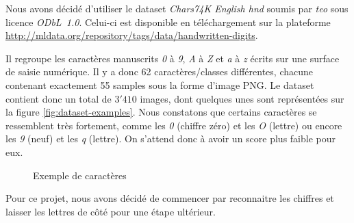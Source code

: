 

Nous avons décidé d'utiliser le dataset \emph{Chars74K English hnd} soumis par \emph{teo} sous licence \emph{ODbL~1.0}. Celui-ci est disponible en téléchargement sur la plateforme \url{http://mldata.org/repository/tags/data/handwritten-digits}.

Il regroupe les caractères manuscrits \emph{0} à \emph{9}, \emph{A} à \emph{Z} et \emph{a} à \emph{z} écrits sur une surface de saisie numérique. Il y a donc 62 caractères/classes différentes, chacune contenant exactement 55 samples sous la forme d'image PNG. Le dataset contient donc un total de $3'410$ images, dont quelques unes sont représentées sur la figure \vref{fig:dataset-examples}. Nous constatons que certains caractères se ressemblent très fortement, comme les \emph{0} (chiffre zéro) et les \emph{O} (lettre) ou encore les \emph{9} (neuf) et les \emph{q} (lettre). On s'attend donc à avoir un score plus faible pour eux.

\begin{figure}[h]
\caption{Exemple de caractères}
\label{fig:dataset-examples}
\end{figure}

Pour ce projet, nous avons décidé de commencer par reconnaitre les chiffres et laisser les lettres de côté pour une étape ultérieur.

